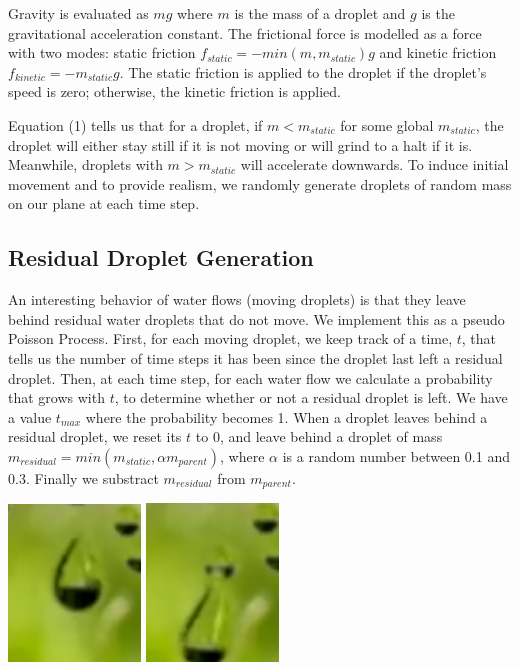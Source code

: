 \documentclass[10pt,twocolumn,letterpaper]{article}
\newenvironment{Figure}
  {\par\medskip\noindent\minipage{\linewidth}}
  {\endminipage\par\medskip}
\begin{document}
Gravity is evaluated as $mg$ where $m$ is the mass of a droplet and $g$ is the gravitational acceleration constant. The frictional force is modelled as a force with two modes: static friction $f_{static} = -min(m, m_{static}) g$ and kinetic friction $f_{kinetic} = -m_{static} g$. The static friction is applied to the droplet if the droplet's speed is zero; otherwise, the kinetic friction is applied.

Equation (1) tells us that for a droplet, if $m < m_{static}$ for some global $m_{static}$, the droplet will either stay still if it is not moving or will grind to a halt if it is. Meanwhile, droplets with $m > m_{static}$ will accelerate downwards. To induce initial movement and to provide realism, we randomly generate droplets of random mass on our plane at each time step.


\subsection{Residual Droplet Generation}

An interesting behavior of water flows (moving droplets) is that they leave behind residual water droplets that do not move. We implement this as a pseudo Poisson Process. First, for each moving droplet, we keep track of a time, $t$, that tells us the number of time steps it has been since the droplet last left a residual droplet. Then, at each time step, for each water flow we calculate a probability that grows with $t$, to determine whether or not a residual droplet is left. We have a value $t_{max}$ where the probability becomes 1. When a droplet leaves behind a residual droplet, we reset its $t$ to 0, and leave behind a droplet of mass $m_{residual} = min(m_{static}, \alpha m_{parent})$, where $\alpha$ is a random number between 0.1 and 0.3. Finally we substract $m_{residual}$ from $m_{parent}$.

\begin{Figure}
    \centering
    \includegraphics[width=100pt]{before.png}
    \includegraphics[width=100pt]{after.png}
    \label{fig:residual}
\end{Figure}
\end{document}
